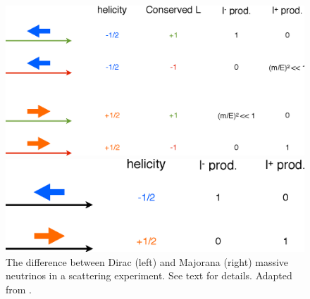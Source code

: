 \begin{figure}[t!b!]
\begin{minipage}[t]{0.54\textwidth}
\vspace{0pt}
\includegraphics[width=\textwidth]{img/DiracNeutrinoInteraction.eps} %
\end{minipage}
\hfill
\begin{minipage}[t]{0.41\textwidth} %
\vspace{0pt}
\includegraphics[width=\textwidth]{img/MajoranaNeutrinoInteraction.eps} %
\end{minipage} 
\caption{The difference between Dirac (left) and Majorana (right) massive neutrinos in a scattering experiment. See text for details. Adapted from \cite{Parke:2010sct}.}
\label{fig:DiracMajoranaNeutrinoInteractions}
\end{figure}

